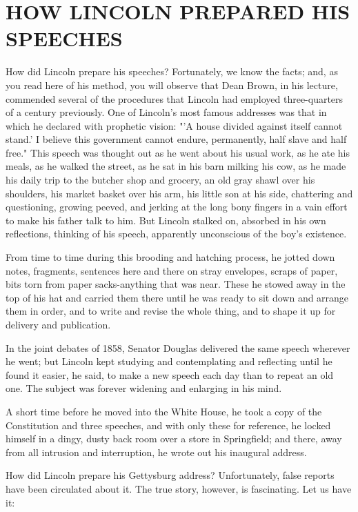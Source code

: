 \documentclass[10pt]{article}
\begin{document}
\section*{HOW LINCOLN PREPARED HIS SPEECHES}
How did Lincoln prepare his speeches? Fortunately, we know the facts; and, as you read here of his method, you will observe that Dean Brown, in his lecture, commended several of the procedures that Lincoln had employed three-quarters of a century previously. One of Lincoln's most famous addresses was that in which he declared with prophetic vision: "'A house divided against itself cannot stand.' I believe this government cannot endure, permanently, half slave and half free." This speech was thought out as he went about his usual work, as he ate his meals, as he walked the street, as he sat in his barn milking his cow, as he made his daily trip to the butcher shop and grocery, an old gray shawl over his shoulders, his market basket over his arm, his little son at his side, chattering and questioning, growing peeved, and jerking at the long bony fingers in a vain effort to make his father talk to him. But Lincoln stalked on, absorbed in his own reflections, thinking of his speech, apparently unconscious of the boy's existence.

From time to time during this brooding and hatching process, he jotted down notes, fragments, sentences here and there on stray envelopes, scraps of paper, bits torn from paper sacks-anything that was near. These he stowed away in the top of his hat and carried them there until he was ready to sit down and arrange them in order, and to write and revise the whole thing, and to shape it up for delivery and publication.

In the joint debates of 1858, Senator Douglas delivered the same speech wherever he went; but Lincoln kept studying and contemplating and reflecting until he found it easier, he said, to make a new speech each day than to repeat an old one. The subject was forever widening and enlarging in his mind.

A short time before he moved into the White House, he took a copy of the Constitution and three speeches, and with only these for reference, he locked himself in a dingy, dusty back room over a store in Springfield; and there, away from all intrusion and interruption, he wrote out his inaugural address.

How did Lincoln prepare his Gettysburg address? Unfortunately, false reports have been circulated about it. The true story, however, is fascinating. Let us have it:
\end{document}
